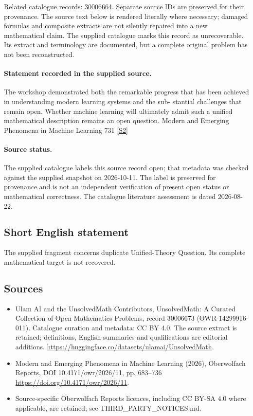 \documentclass[11pt]{article}
\begin{document}
Related catalogue records: \href{https://mehmetmars7.github.io/Erdosproblems-llm-hunter/problem.html?type=open_problems&id=30006664}{30006664}. Separate source IDs are preserved for their provenance.
The source text below is rendered literally where necessary; damaged formulas and composite extracts are not silently repaired into a new mathematical claim.
The supplied catalogue marks this record as unrecoverable. Its extract and terminology are documented, but a complete original problem has not been reconstructed.
\paragraph{Statement recorded in the supplied source.}
The workshop demonstrated both the remarkable progress that has been achieved in understanding modern learning systems and the sub- stantial challenges that remain open. Whether machine learning will ultimately admit such a uniﬁed mathematical description remains an open question. Modern and Emerging Phenomena in Machine Learning 731 \href{https://doi.org/10.4171/owr/2026/11}{[S2]}
\paragraph{Source status.}
The supplied catalogue labels this source record open; that metadata was checked against the supplied snapshot on 2026-10-11. The label is preserved for provenance and is not an independent verification of present open status or mathematical correctness. The catalogue literature assessment is dated 2026-08-22.
\subsection{Short English statement}
The supplied fragment concerns duplicate Unified-Theory Question. Its complete mathematical target is not recovered.
\subsection{Sources}
\begin{itemize}
\item[S1] Ulam AI and the UnsolvedMath Contributors, UnsolvedMath: A Curated Collection of Open Mathematics Problems, record 30006673 (OWR-14299916-011). Catalogue curation and metadata: CC BY 4.0. The source extract is retained; definitions, English summaries and qualifications are editorial additions.
\url{https://huggingface.co/datasets/ulamai/UnsolvedMath}.
\item[S2] Modern and Emerging Phenomena in Machine Learning (2026), Oberwolfach Reports, DOI 10.4171/owr/2026/11, pp. 683--736
\url{https://doi.org/10.4171/owr/2026/11}.
\item Source-specific Oberwolfach Reports licences, including CC BY-SA 4.0 where applicable, are retained; see THIRD\_PARTY\_NOTICES.md.
\end{itemize}
\end{document}
